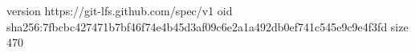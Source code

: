 version https://git-lfs.github.com/spec/v1
oid sha256:7fbcbc427471b7bf46f74e4b45d3af09c6e2a1a492db0ef741c545e9c9e4f3fd
size 470
